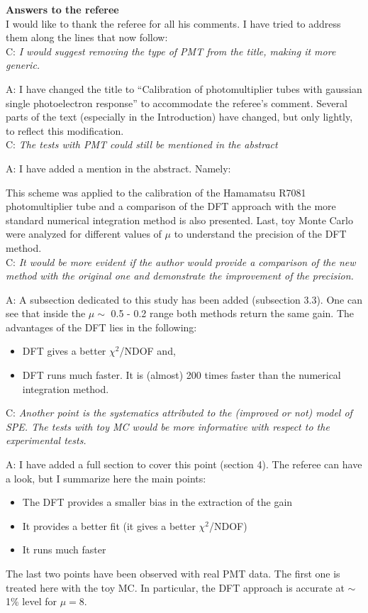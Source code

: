 \documentclass[a4paper,11pt]{article}
\begin{document}
{\bf Answers to the referee}
\\[1ex]

I would like to thank the referee for all his comments. 
I have tried to address them along the lines that now follow:
\\[1ex]

C: \emph{ I would suggest removing the type of PMT from the title, making it more generic. } 
	
A: I have changed the title to ``Calibration of photomultiplier tubes with gaussian single photoelectron response'' 
to accommodate the referee's comment.
Several parts of the text (especially in the Introduction) have changed, but only lightly, to reflect this modification. 
\\[1ex]

C: \emph{The tests with PMT could still be mentioned in the abstract} 

A: I have added a mention in the abstract. Namely: 

This scheme was applied to the calibration of the Hamamatsu R7081 photomultiplier tube and a comparison of the DFT approach with the more standard numerical integration method is also presented.
Last, toy Monte Carlo were analyzed for different values of $\mu$ to understand the precision of the DFT method.
\\[1ex]

C: \emph{ It would be more evident if the author would provide a comparison of the new method with the original one and demonstrate the improvement of the precision. }
	
A: A subsection dedicated to this study has been added (subsection 3.3). 
One can see that inside the $\mu\sim$ 0.5 - 0.2 range both methods return the same gain. 
The advantages of the DFT lies in the following:
\begin{itemize}
\item DFT gives a better $\chi^2$/NDOF and, 
\item DFT runs much faster. 
It is (almost) 200 times faster than the numerical integration method. 
\end{itemize}


C: \emph{Another point is the systematics attributed to the (improved or not) model of SPE. 
The tests with toy MC would be more informative with respect to the experimental tests.}

A: I have added a full section to cover this point (section 4). The referee can have a look, but I summarize here the main points: 
\begin{itemize}
\item The DFT provides a smaller bias in the extraction of the gain
\item It provides a better fit (it gives a better $\chi^2$/NDOF)
\item It runs much faster 
\end{itemize}
The last two points have been observed with real PMT data. 
The first one is treated here with the toy MC. 
In particular, the DFT approach is accurate at $\sim$ 1\% level for $\mu=8$. 
\\[1ex]
\end{document}
